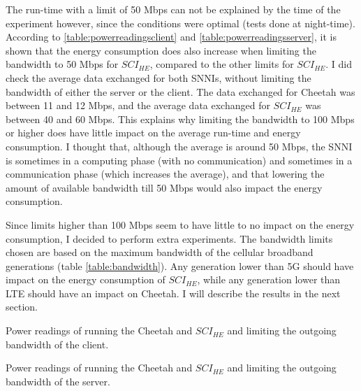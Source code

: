 \documentclass[../thesis.tex]{subfiles}
\begin{document}
The run-time with a limit of 50 Mbps can not be explained by the time of the experiment however, since the conditions were optimal (tests done at night-time). According to \autoref{table:powerreadingsclient} and \autoref{table:powerreadingsserver}, it is shown that the energy consumption does also increase when limiting the bandwidth to 50 Mbps for $SCI_{HE}$, compared to the other limits for $SCI_{HE}$. I did check the average data exchanged for both SNNIs, without limiting the bandwidth of either the server or the client. The data exchanged for Cheetah was between 11 and 12 Mbps, and the average data exchanged for $SCI_{HE}$ was between 40 and 60 Mbps. This explains why limiting the bandwidth to 100 Mbps or higher does have little impact on the average run-time and energy consumption. I thought that, although the average is around 50 Mbps, the SNNI is sometimes in a computing phase (with no communication) and sometimes in a communication phase (which increases the average), and that lowering the amount of available bandwidth till 50 Mbps would also impact the energy consumption.  

Since limits higher than 100 Mbps seem to have little to no impact on the energy consumption, I decided to perform extra experiments. The bandwidth limits chosen are based on the maximum bandwidth of the cellular broadband generations (table \ref{table:bandwidth}). Any generation lower than 5G should have impact on the energy consumption of $SCI_{HE}$, while any generation lower than LTE should have an impact on Cheetah. I will describe the results in the next section. 
\endgroup
\begin{table}[htb]
    \begin{adjustbox}{width=.9\columnwidth,center}
        
    \end{adjustbox}
    \caption{Power readings of running the Cheetah and $SCI_{HE}$ and limiting the outgoing bandwidth of the client.}
    \label{table:powerreadingsclient}
\end{table}

\begin{table}[htbp]
    \begin{adjustbox}{width=.9\columnwidth,center}
        
    \end{adjustbox}
    \caption{Power readings of running the Cheetah and $SCI_{HE}$ and limiting the outgoing bandwidth of the server.}
    \label{table:powerreadingsserver}
\end{table}
\end{document}
